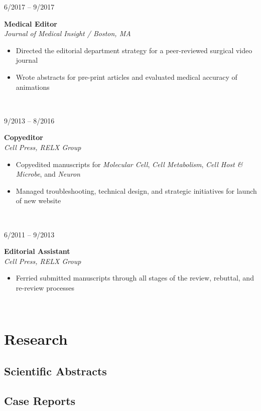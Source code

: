 \documentclass{book}
\newcommand\colleft{.20}
\newcommand\colright{.75}
\newcommand{\entryfour}[4]
	{
		\begin{minipage}[t]{\colleft\textwidth}
		\hfill \textsc{#1}
		\end{minipage}
		\hfill\vline\hfill
		\begin{minipage}[t]{\colright\textwidth}
		{\bf#2}\\
		\textit{#3}
		\footnotesize{#4}
		\end{minipage}\\
		\entryvspace
	}%
\newcommand{\entryvspace}{\vspace{0.5em}}
\begin{document}
		\entryfour{6/2017 -- 9/2017}{Medical Editor}{Journal of Medical Insight / Boston, MA}{%
		\begin{itemize}
			\item Directed the editorial department strategy for a peer-reviewed surgical video journal
			\item Wrote abstracts for pre-print articles and evaluated medical accuracy of animations
		\end{itemize}
		}
		
		\entryfour{9/2013 -- 8/2016}{Copyeditor}{Cell Press, RELX Group}{%
			\begin{itemize}
				\item Copyedited manuscripts for \emph{Molecular Cell}, \emph{Cell Metabolism}, \emph{Cell Host \& Microbe}, and \emph{Neuron}
				\item Managed troubleshooting, technical design, and strategic initiatives for launch of new website 
			\end{itemize}
		}
		
		\entryfour{6/2011 -- 9/2013}{Editorial Assistant}{Cell Press, RELX Group}{%
			\begin{itemize}
				\item Ferried submitted manuscripts through all stages of the review, rebuttal, and re-review processes
			\end{itemize}
		}

\section*{Research}
	\nocite{*}
	\subsection*{Scientific Abstracts}
		\printbibliography[keyword=abstract, heading=none]	
	\subsection*{Case Reports}
		\printbibliography[keyword=caseRep, heading=none]
\end{document}
